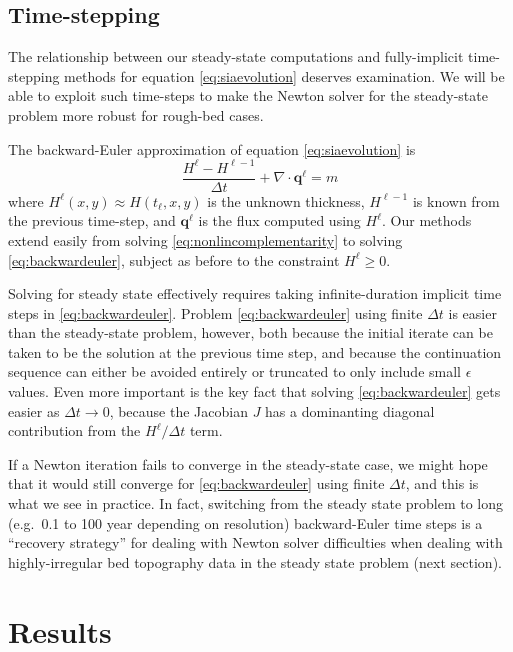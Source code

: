 \documentclass[twocolumn,letterpaper]{igs}
\newcommand\bq{\mathbf{q}}
\newcommand{\Div}{\nabla\cdot}
\newcommand\eps{\epsilon}
\begin{document}
\subsection{Time-stepping}

The relationship between our steady-state computations and fully-implicit time-stepping methods for equation \eqref{eq:siaevolution} deserves examination.  We will be able to exploit such time-steps to make the Newton solver for the steady-state problem more robust for rough-bed cases.

The backward-Euler \citep{MortonMayers2005} approximation of equation \eqref{eq:siaevolution} is
\begin{equation}
\frac{H^\ell - H^{\ell-1}}{\Delta t} + \Div \bq^\ell = m \label{eq:backwardeuler}
\end{equation}
where $H^\ell(x,y) \approx H(t_\ell,x,y)$ is the unknown thickness, $H^{\ell-1}$ is known from the previous time-step, and $\bq^\ell$ is the flux computed using $H^\ell$.  Our methods extend easily from solving \eqref{eq:nonlincomplementarity} to solving \eqref{eq:backwardeuler}, subject as before to the constraint $H^\ell\ge 0$.

Solving for steady state effectively requires taking infinite-duration implicit time steps in \eqref{eq:backwardeuler}.  Problem \eqref{eq:backwardeuler} using finite $\Delta t$ is easier than the steady-state problem, however, both because the initial iterate can be taken to be the solution at the previous time step, and because the continuation sequence can either be avoided entirely or truncated to only include small $\eps$ values.  Even more important is the key fact that solving \eqref{eq:backwardeuler} gets easier as $\Delta t\to 0$, because the Jacobian $J$ has a dominanting diagonal contribution from the $H^\ell/\Delta t$ term.

If a Newton iteration fails to converge in the steady-state case, we might hope that it would still converge for \eqref{eq:backwardeuler} using finite $\Delta t$, and this is what we see in practice.  In fact, switching from the steady state problem to long (e.g.~0.1 to 100 year depending on resolution) backward-Euler time steps is a ``recovery strategy'' for dealing with Newton solver difficulties when dealing with highly-irregular bed topography data in the steady state problem (next section).


\section{Results}
\end{document}
